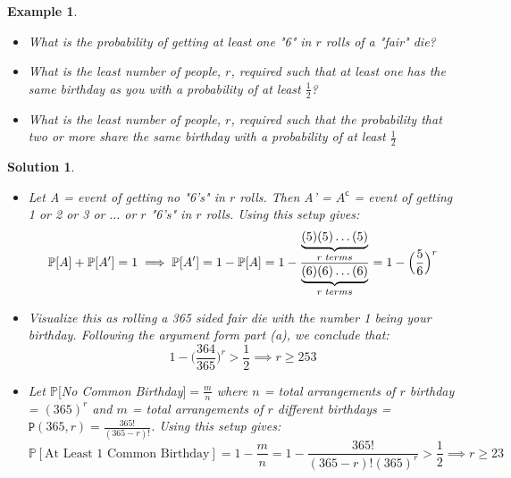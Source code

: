 \documentclass[12pt, letterpaper, onecolumn, conference, final]{IEEEtran}
\theoremstyle{definition}
\theoremstyle{plain}
\newtheorem{example}{Example}[section]
\newtheorem{solution}{Solution}[section]
\begin{document}
\begin{example}
\hfill
\begin{itemize}

\item[(a)]
What is the probability of getting at least one "6" in $r$ rolls of a "fair" die?

\vspace{.2cm}
\item[(b)]
What is the least number of people, $r$, required such that at least one has the same birthday as you with a probability of at least $\frac{1}{2}$?

\vspace{.2cm}
\item[(c)]
What is the least number of people, $r$, required such that the probability that two or more share the same birthday with a probability of at least $\frac{1}{2}$

\end{itemize}
\end{example}
\begin{solution}
\hfill
\begin{itemize}

\item[(a)]
Let A = event of getting no "6's" in $r$ rolls. Then A' = $A^\mathsf{c}$ = event of getting 1 or 2 or 3 or $\dots$ or $r$ "6's" in $r$ rolls. Using this setup gives:
\begin{equation*}
\mathbb{P}[A] + \mathbb{P}[A'] = 1 \implies \mathbb{P}[A'] = 1 - \mathbb{P}[A] = 1 - \frac{\underbrace{(5)(5)\dots (5)}_{r \hspace{.1cm} terms}}{\underbrace{(6)(6)\dots (6)}_{r \hspace{.1cm} terms}} = 1 - \Big( \frac{5}{6} \Big)^r
\end{equation*}

\vspace{.2cm}
\item[(b)]
Visualize this as rolling a 365 sided fair die with the number 1 being your birthday. Following the argument form part (a), we conclude that:
\begin{equation*}
1 - \Big( \frac{364}{365} \Big)^r > \frac{1}{2} \implies r \geq 253
\end{equation*}

\vspace{.2cm}
\item[(c)]
Let $\mathbb{P}[$No Common Birthday$] = \frac{m}{n}$ where $n$ = total arrangements of $r$ birthday = $(365)^r$ and $m$ = total arrangements of $r$ different birthdays = $\mathtt{P}(365,r) = \frac{365!}{(365-r)!}$. Using this setup gives:
\begin{equation*}
\mathbb{P}[\text{At Least 1 Common Birthday}] = 1 - \frac{m}{n} = 1 - \frac{365!}{(365-r)!(365)^r} > \frac{1}{2} \implies r \geq 23
\end{equation*}

\end{itemize}
\end{solution}
\end{document}
